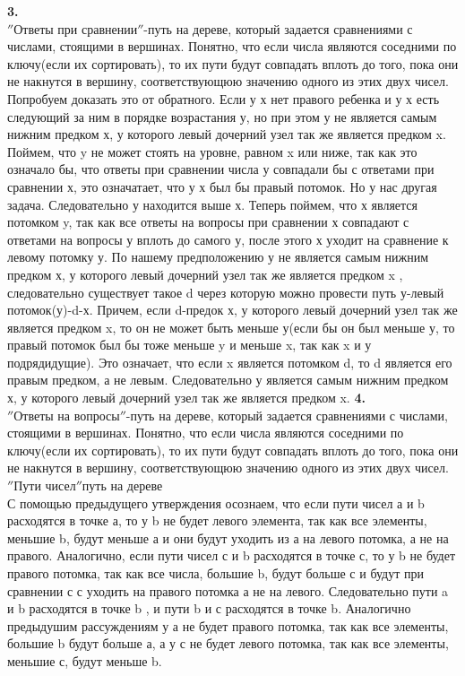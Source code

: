 \documentclass[a4paper,12pt]{article}
\begin{document}
\textbf{3.}\\
$''$Ответы при сравнении$''$-путь на дереве, который задается сравнениями с числами, стоящими в вершинах. Понятно, что если числа являются соседними по ключу(если их сортировать), то их пути будут совпадать вплоть до того, пока они не накнутся в вершину, соответствующюю значению одного из этих двух чисел.\\
Попробуем доказать это от обратного. Если у х нет правого ребенка и у х есть следующий за ним в порядке возрастания у, но при этом у не является самым нижним предком х, у которого левый дочерний узел так же является предком x. Поймем, что y не может стоять на уровне, равном x или ниже, так как это означало бы, что ответы при сравнении числа у совпадали бы с ответами при сравнении х, это означатает, что у х был бы правый потомок. Но у нас другая задача. Следовательно у находится выше х. Теперь поймем, что х является потомком y, так как все ответы на вопросы при сравнении х совпадают с ответами на вопросы у вплоть до самого у, после этого х уходит на сравнение к левому потомку у. По нашему предположению у не является самым нижним предком х, у которого левый дочерний узел так же является предком x , следовательно существует такое d через которую можно провести путь у-левый потомок(у)-d-х. Причем, если d-предок х, у которого левый дочерний узел так же является предком x, то он не может быть меньше у(если бы он был меньше у, то правый потомок был бы тоже меньше y и меньше x, так как x и у подрядидущие). Это означает, что если x является потомком d, то d является его правым предком, а не левым. Следовательно у является самым нижним предком х, у которого левый дочерний узел так же является предком x.
\textbf{4.}\\
$''$Ответы на вопросы$''$-путь на дереве, который задается сравнениями с числами, стоящими в вершинах. Понятно, что если числа являются соседними по ключу(если их сортировать), то их пути будут совпадать вплоть до того, пока они не накнутся в вершину, соответствующюю значению одного из этих двух чисел.\\
$''$Пути чисел$''$путь на дереве\\
С помощью предыдущего утверждения осознаем, что если пути чисел а и b расходятся в точке а, то у b не будет левого элемента, так как все элементы, меньшие b, будут меньше а и они будут уходить из а на левого потомка, а не на правого. Аналогично, если пути чисел с и b расходятся в точке с, то у b не будет правого потомка, так как все числа, большие b, будут больше с и будут при сравнении с с уходить на правого потомка а не на левого. Следовательно пути a и b расходятся в точке b , и пути b и с расходятся в точке b. Аналогично предыдушим рассуждениям у а не будет правого потомка, так как все элементы, большие b будут больше а, а у с не будет левого потомка, так как все элементы, меньшие с, будут меньше b.\\
\end{document}
